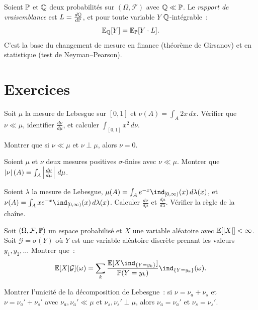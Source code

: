 \begin{exemple}
Soient $\mathbb{P}$ et $\mathbb{Q}$ deux probabilit\'es sur $(\Omega, \mathcal{F})$ avec $\mathbb{Q} \ll \mathbb{P}$.
Le \emph{rapport de vraisemblance} est $L = \frac{d\mathbb{Q}}{d\mathbb{P}}$, et pour toute variable
$Y$ $\mathbb{Q}$-int\'egrable~:
\[
    \mathbb{E}_{\mathbb{Q}}[Y] = \mathbb{E}_{\mathbb{P}}[Y \cdot L].
\]
C'est la base du changement de mesure en finance (th\'eor\`eme de Girsanov) et en
statistique (test de Neyman--Pearson).
\end{exemple}

\section{Exercices}

\begin{exercice}
Soit $\mu$ la mesure de Lebesgue sur $[0,1]$ et $\nu(A) = \int_A 2x\, dx$.
V\'erifier que $\nu \ll \mu$, identifier $\frac{d\nu}{d\mu}$, et calculer
$\int_{[0,1]} x^2\, d\nu$.
\end{exercice}

\begin{exercice}
Montrer que si $\nu \ll \mu$ et $\nu \perp \mu$, alors $\nu = 0$.
\end{exercice}

\begin{exercice}
Soient $\mu$ et $\nu$ deux mesures positives $\sigma$-finies avec $\nu \ll \mu$.
Montrer que $\left| \nu \right|(A) = \int_A \left| \frac{d\nu}{d\mu} \right|\, d\mu$.
\end{exercice}

\begin{exercice}
Soient $\lambda$ la mesure de Lebesgue, $\mu(A) = \int_A e^{-x} \ind_{[0,\infty)}(x)\, d\lambda(x)$,
et $\nu(A) = \int_A x e^{-x} \ind_{[0,\infty)}(x)\, d\lambda(x)$.
Calculer $\frac{d\nu}{d\mu}$ et $\frac{d\mu}{d\lambda}$.
V\'erifier la r\`egle de la cha\^ine.
\end{exercice}

\begin{exercice}
Soit $(\Omega, \mathcal{F}, \mathbb{P})$ un espace probabilis\'e et $X$ une variable al\'eatoire
avec $\mathbb{E}[\left| X \right|] < \infty$. Soit $\mathcal{G} = \sigma(Y)$ o\`u $Y$ est une variable
al\'eatoire discr\`ete prenant les valeurs $y_1, y_2, \ldots$ Montrer que~:
\[
    \E[X | \mathcal{G}](\omega) = \sum_{k} \frac{\E[X \ind_{\{Y = y_k\}}]}{\PP(Y = y_k)}
    \ind_{\{Y = y_k\}}(\omega).
\]
\end{exercice}

\begin{exercice}
Montrer l'unicit\'e de la d\'ecomposition de Lebesgue~: si $\nu = \nu_a + \nu_s$
et $\nu = \nu_a' + \nu_s'$ avec $\nu_a, \nu_a' \ll \mu$ et
$\nu_s, \nu_s' \perp \mu$, alors $\nu_a = \nu_a'$ et $\nu_s = \nu_s'$.
\end{exercice}
